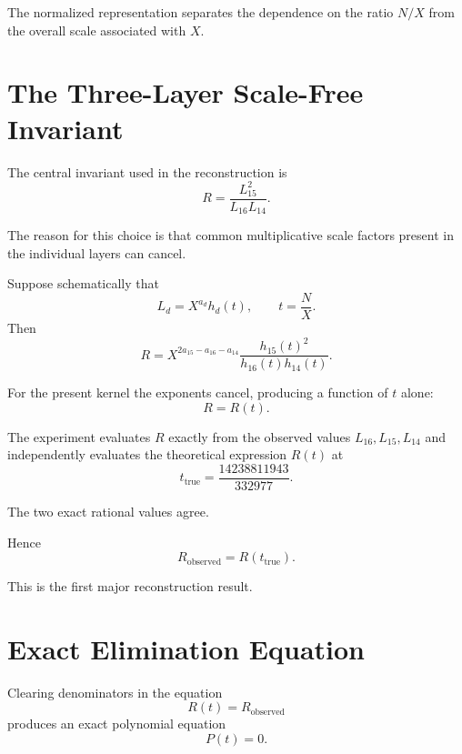 \documentclass[11pt,a4paper]{article}
\theoremstyle{definition}
\theoremstyle{remark}
\begin{document}
The normalized representation separates the dependence on the ratio
$N/X$ from the overall scale associated with $X$.

\section{The Three-Layer Scale-Free Invariant}

The central invariant used in the reconstruction is
\begin{equation}
\boxed{
R=
\frac{L_{15}^2}{L_{16}L_{14}}.
}
\end{equation}

The reason for this choice is that common multiplicative scale factors
present in the individual layers can cancel.

Suppose schematically that
\begin{equation}
L_d=X^{a_d}h_d(t),
\qquad
t=\frac{N}{X}.
\end{equation}
Then
\begin{equation}
R
=
X^{2a_{15}-a_{16}-a_{14}}
\frac{h_{15}(t)^2}{h_{16}(t)h_{14}(t)}.
\end{equation}

For the present kernel the exponents cancel, producing a function of
$t$ alone:
\begin{equation}
R=R(t).
\end{equation}

The experiment evaluates $R$ exactly from the observed values
$L_{16},L_{15},L_{14}$ and independently evaluates the theoretical
expression $R(t)$ at
\[
t_{\mathrm{true}}
=
\frac{14238811943}{332977}.
\]

The two exact rational values agree.

Hence
\begin{equation}
\boxed{
R_{\mathrm{observed}}
=
R(t_{\mathrm{true}}).
}
\end{equation}

This is the first major reconstruction result.

\section{Exact Elimination Equation}

Clearing denominators in the equation
\begin{equation}
R(t)=R_{\mathrm{observed}}
\end{equation}
produces an exact polynomial equation
\begin{equation}
P(t)=0.
\end{equation}
\end{document}
